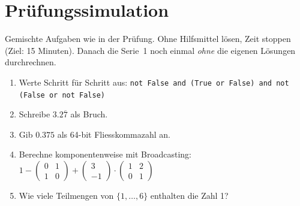\section{Prüfungssimulation}
Gemischte Aufgaben wie in der Prüfung. Ohne Hilfsmittel lösen, Zeit stoppen
(Ziel: 15 Minuten). Danach die Serie~1 noch einmal \emph{ohne} die eigenen Lösungen
durchrechnen.
\begin{enumerate}[resume*=fragen01]
  \item Werte Schritt für Schritt aus:
        \texttt{not False and (True or False) and not (False or not False)}
  \item Schreibe $3.2\overline{7}$ als Bruch.
  \item Gib $0.375$ als 64-bit Fliesskommazahl an.
  \item Berechne komponentenweise mit Broadcasting:
        $1 - \begin{pmatrix}0&1\\1&0\end{pmatrix} + \begin{pmatrix}3\\-1\end{pmatrix}
        \cdot \begin{pmatrix}1&2\\0&1\end{pmatrix}$
  \item Wie viele Teilmengen von $\{1, \ldots, 6\}$ enthalten die Zahl 1?
\end{enumerate}

